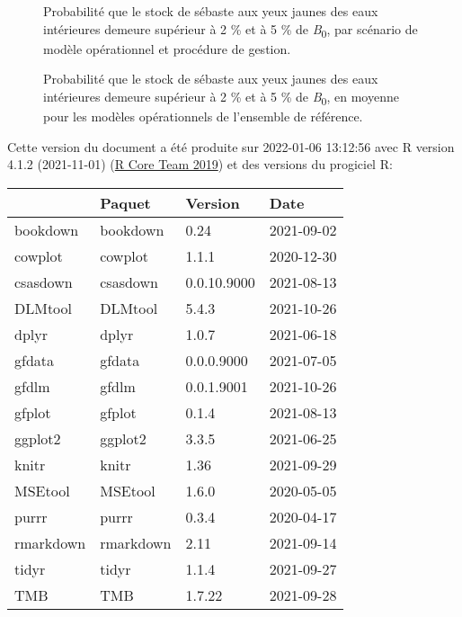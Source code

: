 \documentclass[french,11pt]{book}
\begin{document}
\begin{figure}[htb]

{\centering {} 

}

\caption{Probabilité que le stock de sébaste aux yeux jaunes des eaux intérieures demeure supérieur à 2 \% et à 5 \% de \emph{B}\textsubscript{0}, par scénario de modèle opérationnel et procédure de gestion.}\label{fig:cosewic-all}
\end{figure}
\clearpage


\begin{figure}[htb]

{\centering {} 

}

\caption{Probabilité que le stock de sébaste aux yeux jaunes des eaux intérieures demeure supérieur à 2 \% et à 5 \% de \emph{B}\textsubscript{0}, en moyenne pour les modèles opérationnels de l'ensemble de référence.}\label{fig:cosewic-avg}
\end{figure}
\clearpage


\clearpage

\hypertarget{environnement-informatique}{%
\label{environnement-informatique}}

Cette version du document a été produite sur 2022-01-06 13:12:56 avec R version 4.1.2 (2021-11-01) (\protect\hyperlink{ref-r2019}{R Core Team 2019}) et des versions du progiciel R:
\begin{longtable}[]{@{}llll@{}}
\toprule
& Paquet & Version & Date \\
\midrule
\endhead
bookdown & bookdown & 0.24 & 2021-09-02 \\
cowplot & cowplot & 1.1.1 & 2020-12-30 \\
csasdown & csasdown & 0.0.10.9000 & 2021-08-13 \\
DLMtool & DLMtool & 5.4.3 & 2021-10-26 \\
dplyr & dplyr & 1.0.7 & 2021-06-18 \\
gfdata & gfdata & 0.0.0.9000 & 2021-07-05 \\
gfdlm & gfdlm & 0.0.1.9001 & 2021-10-26 \\
gfplot & gfplot & 0.1.4 & 2021-08-13 \\
ggplot2 & ggplot2 & 3.3.5 & 2021-06-25 \\
knitr & knitr & 1.36 & 2021-09-29 \\
MSEtool & MSEtool & 1.6.0 & 2020-05-05 \\
purrr & purrr & 0.3.4 & 2020-04-17 \\
rmarkdown & rmarkdown & 2.11 & 2021-09-14 \\
tidyr & tidyr & 1.1.4 & 2021-09-27 \\
TMB & TMB & 1.7.22 & 2021-09-28 \\
\bottomrule
\end{longtable}
\vspace{4mm}
\end{document}
